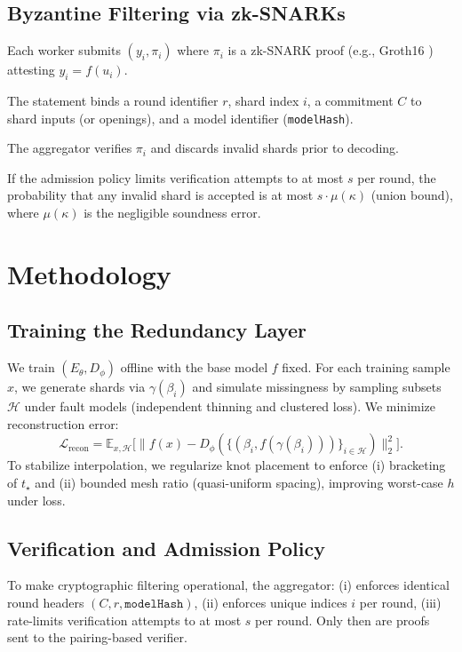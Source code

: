\documentclass[sigconf]{acmart}
\begin{document}
\subsection{Byzantine Filtering via zk-SNARKs}
Each worker submits $(y_i,\pi_i)$ where $\pi_i$ is a zk-SNARK proof (e.g., Groth16 \cite{groth2016}) attesting $y_i=f(u_i)$.





The statement binds a round identifier $r$, shard index $i$, a commitment $C$ to shard inputs (or openings), and a model identifier (\texttt{modelHash}).




The aggregator verifies $\pi_i$ and discards invalid shards prior to decoding.





If the admission policy limits verification attempts to at most $s$ per round, the probability that any invalid shard is accepted is at most $s\cdot\mu(\kappa)$ (union bound), where $\mu(\kappa)$ is the negligible soundness error.





\section{Methodology}
\subsection{Training the Redundancy Layer}
We train $(E_\theta,D_\phi)$ offline with the base model $f$ fixed.
For each training sample $x$, we generate shards via $\gamma(\beta_i)$ and simulate missingness by sampling subsets $\mathcal{H}$ under fault models (independent thinning and clustered loss).
We minimize reconstruction error:
\[
\mathcal{L}_{\text{recon}}=\mathbb{E}_{x,\mathcal{H}}\bigl[\|f(x)-D_\phi(\{(\beta_i,f(\gamma(\beta_i)))\}_{i\in\mathcal{H}})\|_2^2\bigr].
\]
To stabilize interpolation, we regularize knot placement to enforce (i) bracketing of $t_\star$ and (ii) bounded mesh ratio (quasi-uniform spacing), improving worst-case $h$ under loss.

\subsection{Verification and Admission Policy}
To make cryptographic filtering operational, the aggregator:
(i) enforces identical round headers $(C,r,\texttt{modelHash})$,
(ii) enforces unique indices $i$ per round,
(iii) rate-limits verification attempts to at most $s$ per round.
Only then are proofs sent to the pairing-based verifier.
\end{document}

